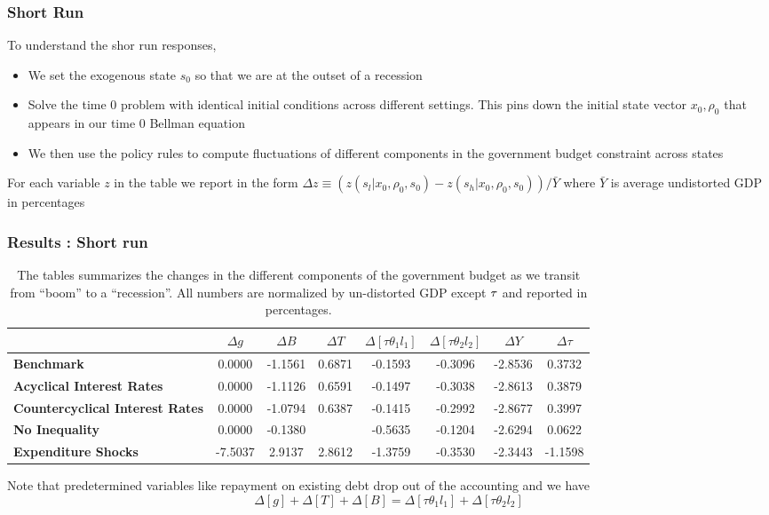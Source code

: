 \documentclass{beamer}
\begin{document}
 \begin{frame}
  \frametitle{Short Run}
  To understand the shor run responses, 
  \begin{itemize}
   \item   We set the exogenous state $s_0$ so  that we are at the outset of a recession
   \item Solve the time 0 problem with identical initial conditions across
different settings. This pins down the initial state vector  $x_0,\rho_0$  that appears in our time $0$ Bellman equation
\item We then use the policy rules to compute fluctuations of
different components in the government budget constraint across states
  \end{itemize}
For each variable
$z$ in the table we report in the form $\Delta z\equiv \left( z\left(
s_l|x_0,\rho_0,s_0\right) -z\left( s_h|x_0,\rho_0,s_0\right) \right) /\bar{Y}
$ where $\bar{Y}$ is average undistorted GDP in percentages
 \end{frame}

 
 \begin{frame}
 \frametitle{Results : Short run}
 {\tiny
\begin{table}[tbp]
\begin{tabular}{|l|c|c|c|c|c|c|c|}
\hline
& \textbf{$\Delta g$} & \textbf{$\Delta B$} & \textbf{$\Delta T$} & \textbf{$%
\Delta [\tau\theta_1l_1]$} & \textbf{$\Delta [\tau\theta_2l_2]$} & \textbf{$%
\Delta Y$} & \textbf{$\Delta \tau$} \\ \hline
\textbf{Benchmark} & 0.0000 & -1.1561 & 0.6871 & -0.1593 & -0.3096 & -2.8536
& 0.3732 \\ \hline
\textbf{Acyclical Interest Rates} & 0.0000 & -1.1126 & 0.6591 & -0.1497 &
-0.3038 & -2.8613 & 0.3879 \\ \hline
\textbf{Countercyclical Interest Rates} & 0.0000 & -1.0794 & 0.6387 & -0.1415 &
-0.2992 & -2.8677 & 0.3997 \\ \hline
\textbf{No Inequality} & 0.0000 & -0.1380 &\color{red}{\textbf{ -0.5459}} & -0.5635 & -0.1204 &
-2.6294 & 0.0622 \\ \hline
\textbf{Expenditure Shocks} & -7.5037 & 2.9137 & 2.8612 & -1.3759 & -0.3530 & -2.3443 &
-1.1598 \\ \hline

\end{tabular}%

\caption{The tables summarizes the changes in the different components of the government budget as we transit from ``boom'' to a ``recession''.  All numbers are normalized by un-distorted GDP except $\protect\tau $ and reported in percentages.
}

\label{tab:ShortRunPolicyResponses}
\end{table}
}
Note that predetermined variables like repayment on existing debt drop out
of the accounting and we have
\begin{equation*}
\Delta [g]+\Delta[T]+ \Delta [B]=\Delta[\tau \theta_1 l_1]+ \Delta[\tau
\theta_2 l_2]
\end{equation*}%

 \end{frame}
\end{document}
